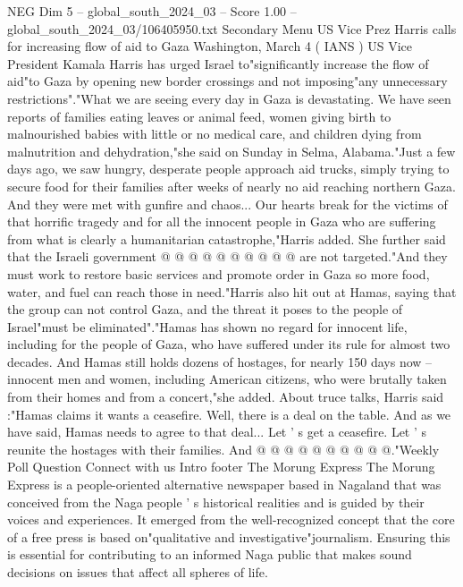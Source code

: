 \begin{textsample}{NEG Dim 5 – global\_south\_2024\_03 – Score 1.00 – global\_south\_2024\_03/106405950.txt}  \label{ex:f5_neg_207}
Secondary Menu US Vice Prez Harris calls for increasing flow of aid to Gaza Washington, March 4 ( IANS ) US Vice President Kamala Harris has urged Israel to"significantly increase the flow of aid"to Gaza by opening new border crossings and not imposing"any unnecessary restrictions"."What we are seeing every day in Gaza is devastating.
We have seen reports of families eating leaves or animal feed, women giving birth to malnourished babies with little or no medical care, and children dying from malnutrition and dehydration,"she said on Sunday in Selma, Alabama."Just a few days ago, we saw hungry, desperate people approach aid trucks, simply trying to secure food for their families after weeks of nearly no aid reaching northern Gaza.
And they were met with gunfire and chaos...
Our hearts break for the victims of that horrific tragedy and for all the innocent people in Gaza who are suffering from what is clearly a humanitarian catastrophe,"Harris added.
She further said that the Israeli government @ @ @ @ @ @ @ @ @ @ are not targeted."And they must work to restore basic services and promote order in Gaza so more food, water, and fuel can reach those in need."Harris also hit out at Hamas, saying that the group can not control Gaza, and the threat it poses to the people of Israel"must be eliminated"."Hamas has shown no regard for innocent life, including for the people of Gaza, who have suffered under its rule for almost two decades.
And Hamas still holds dozens of hostages, for nearly 150 days now -- innocent men and women, including American citizens, who were brutally taken from their homes and from a concert,"she added.
About truce talks, Harris said :"Hamas claims it wants a ceasefire.
Well, there is a deal on the table.
And as we have said, Hamas needs to agree to that deal...
Let ' s get a ceasefire.
Let ' s reunite the hostages with their families.
And @ @ @ @ @ @ @ @ @ @."Weekly Poll Question Connect with us Intro footer The Morung Express The Morung Express is a people-oriented alternative newspaper based in Nagaland that was conceived from the Naga people ' s historical realities and is guided by their voices and experiences.
It emerged from the well-recognized concept that the core of a free press is based on"qualitative and investigative"journalism.
Ensuring this is essential for contributing to an informed Naga public that makes sound decisions on issues that affect all spheres of life.

\end{textsample}
